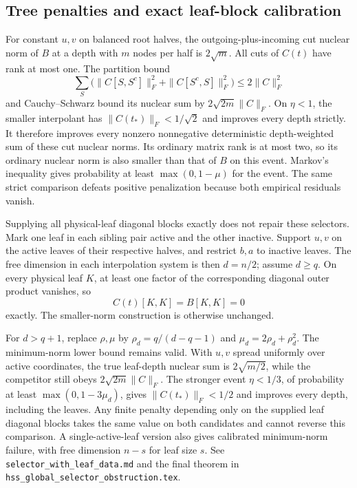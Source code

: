 \documentclass[11pt,oneside,openany,a4paper]{report}
\numberwithin{equation}{chapter}
\theoremstyle{definition}
\theoremstyle{remark}
\newcommand{\sourcefile}[1]{{\small\nolinkurl{#1}}}
\begin{document}
\subsection{Tree penalties and exact leaf-block calibration}

For constant $u,v$ on balanced root halves, the outgoing-plus-incoming
cut nuclear norm of $B$ at a depth with $m$ nodes per half is $2\sqrt m$.
All cuts of $C(t)$ have rank at most one.  The partition bound
\[
 \sum_S\bigl(\|C[S,S^c]\|_F^2+
                    \|C[S^c,S]\|_F^2\bigr)\le2\|C\|_F^2
\]
and Cauchy--Schwarz bound its nuclear sum by
$2\sqrt{2m}\|C\|_F$.  On $\eta<1$, the smaller interpolant has
$\|C(t_*)\|_F<1/\sqrt2$ and improves every depth strictly.  It therefore
improves every nonzero nonnegative deterministic depth-weighted sum of
these cut nuclear norms.  Its ordinary matrix rank is at most two, so
its ordinary nuclear norm is also smaller than that of $B$ on this
event.  Markov's inequality gives probability at least
$\max(0,1-\mu)$ for the event.  The same strict comparison defeats
positive penalization because both empirical residuals vanish.

Supplying all physical-leaf diagonal blocks exactly does not repair
these selectors.  Mark one leaf in each sibling pair active and the
other inactive.  Support $u,v$ on the active leaves of their respective
halves, and restrict $b,a$ to inactive leaves.  The free dimension in
each interpolation system is then $d=n/2$; assume $d\ge q$.  On every
physical leaf $K$, at least one factor of the corresponding diagonal
outer product vanishes, so
\[
 C(t)[K,K]=B[K,K]=0
\]
exactly.  The smaller-norm construction is otherwise unchanged.

For $d>q+1$, replace $\rho,\mu$ by
$\rho_d=q/(d-q-1)$ and $\mu_d=2\rho_d+\rho_d^2$.  The minimum-norm
lower bound remains valid.  With $u,v$ spread uniformly over active
coordinates, the true leaf-depth nuclear sum is $2\sqrt{m/2}$, while
the competitor still obeys $2\sqrt{2m}\|C\|_F$.  The stronger event
$\eta<1/3$, of probability at least $\max(0,1-3\mu_d)$, gives
$\|C(t_*)\|_F<1/2$ and improves every depth, including the leaves.
Any finite penalty depending only on the supplied leaf diagonal blocks
takes the same value on both candidates and cannot reverse this
comparison.  A single-active-leaf version also gives calibrated
minimum-norm failure, with free dimension $n-s$ for leaf size $s$.
See \sourcefile{selector_with_leaf_data.md} and the final theorem in
\sourcefile{hss_global_selector_obstruction.tex}.
\end{document}
